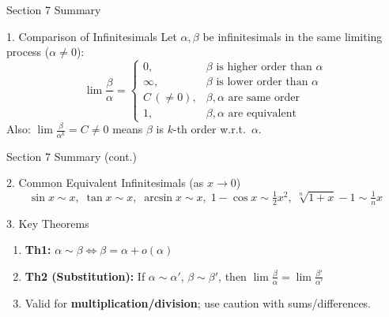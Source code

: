 \documentclass[UTF8,10pt]{beamer}
\begin{document}
\begin{frame}{Section 7 Summary}
\begin{block}{1. Comparison of Infinitesimals}
Let $\alpha, \beta$ be infinitesimals in the same limiting process ($\alpha \neq 0$):
\[
\lim\frac{\beta}{\alpha} =
\begin{cases}
0, & \beta \text{ is higher order than } \alpha \\
\infty, & \beta \text{ is lower order than } \alpha \\
C\,(\neq 0), & \beta, \alpha \text{ are same order} \\
1, & \beta, \alpha \text{ are equivalent}
\end{cases}
\]
Also: $\displaystyle \lim\frac{\beta}{\alpha^k} = C \neq 0$ means $\beta$ is $k$-th order w.r.t.\ $\alpha$.
\end{block}
\end{frame}

\begin{frame}{Section 7 Summary (cont.)}
\begin{block}{2. Common Equivalent Infinitesimals (as $x \to 0$)}
\[
\sin x \sim x,\; \tan x \sim x,\; \arcsin x \sim x,\;
1-\cos x \sim \tfrac{1}{2}x^2,\; \sqrt[n]{1+x}-1 \sim \tfrac{1}{n}x
\]
\end{block}
\pause
\begin{block}{3. Key Theorems}
\begin{enumerate}
    \item \textbf{Th1:} $\alpha \sim \beta \Longleftrightarrow \beta = \alpha + o(\alpha)$
    \item \textbf{Th2 (Substitution):} If $\alpha\sim\alpha'$, $\beta\sim\beta'$, then
          $\displaystyle \lim\frac{\beta}{\alpha} = \lim\frac{\beta'}{\alpha'}$
    \item Valid for \textbf{multiplication/division}; use caution with sums/differences.
\end{enumerate}
\end{block}
\end{frame}

\end{document}
